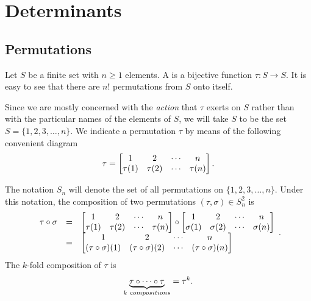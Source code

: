\chapter{Determinants}

\section{Permutations}
\begin{df}
Let $S$ be a finite set with $n \geq 1$ elements. A  is a bijective function $\tau : S \rightarrow S$. It
is easy to see that there are $n!$ permutations from $S$ onto
itself. 
\end{df}
Since we are mostly concerned with the {\em action} that $\tau$
exerts on $S$ rather than with the particular names of the
elements of $S$, we will take $S$ to be the set $S = \{1, 2, 3,
\ldots , n \}$. We indicate a permutation $\tau$ by means of the
following convenient diagram
$$\tau = \begin{bmatrix} 1 & 2 & \cdots & n \cr \tau (1) & \tau (2) & \cdots & \tau (n) \end{bmatrix}.$$
\begin{df}
The notation $S_n$ will denote the set of all permutations on
$\{1, 2, 3, \ldots , n \}$. Under this notation, the  composition
of two permutations $(\tau, \sigma)\in S_n ^2$ is
$$ \begin{array}{lll}\tau\circ \sigma & = & \begin{bmatrix} 1 & 2 & \cdots & n \cr \tau (1) & \tau (2) & \cdots & \tau (n) \end{bmatrix}
\circ\begin{bmatrix} 1 & 2 & \cdots & n \cr \sigma (1) & \sigma
(2) & \cdots & \sigma (n) \end{bmatrix} \\ &  = &
\begin{bmatrix} 1 & 2 & \cdots & n \cr (\tau \circ \sigma)  (1) & (\tau \circ \sigma)  (2) & \cdots &
(\tau \circ \sigma) (n) \end{bmatrix}\end{array}.  $$ The $k$-fold
composition of $\tau$ is
$$ \underbrace{\tau \circ \cdots \circ \tau}_{k\ {\textrm  compositions}} = \tau^k.       $$

\end{df}

